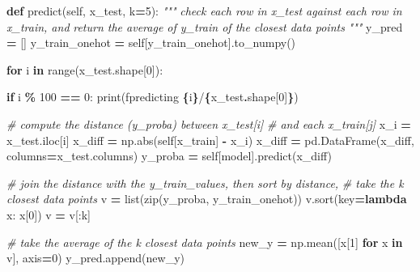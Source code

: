 \documentclass[
]{article}
\newenvironment{Shaded}{\begin{snugshade}}{\end{snugshade}}
\newcommand{\BuiltInTok}[1]{#1}
\newcommand{\CommentTok}[1]{\textcolor[rgb]{0.56,0.35,0.01}{\textit{#1}}}
\newcommand{\ControlFlowTok}[1]{\textcolor[rgb]{0.13,0.29,0.53}{\textbf{#1}}}
\newcommand{\DecValTok}[1]{\textcolor[rgb]{0.00,0.00,0.81}{#1}}
\newcommand{\KeywordTok}[1]{\textcolor[rgb]{0.13,0.29,0.53}{\textbf{#1}}}
\newcommand{\NormalTok}[1]{#1}
\newcommand{\OperatorTok}[1]{\textcolor[rgb]{0.81,0.36,0.00}{\textbf{#1}}}
\newcommand{\SpecialCharTok}[1]{\textcolor[rgb]{0.81,0.36,0.00}{\textbf{#1}}}
\newcommand{\SpecialStringTok}[1]{\textcolor[rgb]{0.31,0.60,0.02}{#1}}
\newcommand{\StringTok}[1]{\textcolor[rgb]{0.31,0.60,0.02}{#1}}
\newcommand{\VariableTok}[1]{\textcolor[rgb]{0.00,0.00,0.00}{#1}}
\begin{document}
\begin{Shaded}
\begin{Highlighting}[]
    \KeywordTok{def}\NormalTok{ predict(}\VariableTok{self}\NormalTok{, x\_test, k}\OperatorTok{=}\DecValTok{5}\NormalTok{):}
        \CommentTok{"""}
\CommentTok{        check each row in x\_test against each row in x\_train, and}
\CommentTok{        return the average of y\_train of the closest data points}
\CommentTok{        """}
\NormalTok{        y\_pred }\OperatorTok{=}\NormalTok{ []}
\NormalTok{        y\_train\_onehot }\OperatorTok{=} \VariableTok{self}\NormalTok{[}\StringTok{\textquotesingle{}y\_train\_onehot\textquotesingle{}}\NormalTok{].to\_numpy()}

        \ControlFlowTok{for}\NormalTok{ i }\KeywordTok{in} \BuiltInTok{range}\NormalTok{(x\_test.shape[}\DecValTok{0}\NormalTok{]):}

            \ControlFlowTok{if}\NormalTok{ i }\OperatorTok{\%} \DecValTok{100} \OperatorTok{==} \DecValTok{0}\NormalTok{:}
                \BuiltInTok{print}\NormalTok{(}\SpecialStringTok{f\textquotesingle{}predicting }\SpecialCharTok{\{}\NormalTok{i}\SpecialCharTok{\}}\SpecialStringTok{/}\SpecialCharTok{\{}\NormalTok{x\_test}\SpecialCharTok{.}\NormalTok{shape[}\DecValTok{0}\NormalTok{]}\SpecialCharTok{\}}\SpecialStringTok{\textquotesingle{}}\NormalTok{)}

            \CommentTok{\# compute the distance (y\_proba) between x\_test[i] }
            \CommentTok{\# and each x\_train[j]}
\NormalTok{            x\_i }\OperatorTok{=}\NormalTok{ x\_test.iloc[i]}
\NormalTok{            x\_diff }\OperatorTok{=}\NormalTok{ np.}\BuiltInTok{abs}\NormalTok{(}\VariableTok{self}\NormalTok{[}\StringTok{\textquotesingle{}x\_train\textquotesingle{}}\NormalTok{] }\OperatorTok{{-}}\NormalTok{ x\_i)}
\NormalTok{            x\_diff }\OperatorTok{=}\NormalTok{ pd.DataFrame(x\_diff, columns}\OperatorTok{=}\NormalTok{x\_test.columns)}
\NormalTok{            y\_proba }\OperatorTok{=} \VariableTok{self}\NormalTok{[}\StringTok{\textquotesingle{}model\textquotesingle{}}\NormalTok{].predict(x\_diff)}

            \CommentTok{\# join the distance with the y\_train\_values, then sort by distance, }
            \CommentTok{\# take the k closest data points}
\NormalTok{            v }\OperatorTok{=} \BuiltInTok{list}\NormalTok{(}\BuiltInTok{zip}\NormalTok{(y\_proba, y\_train\_onehot))}
\NormalTok{            v.sort(key}\OperatorTok{=}\KeywordTok{lambda}\NormalTok{ x: x[}\DecValTok{0}\NormalTok{])}
\NormalTok{            v }\OperatorTok{=}\NormalTok{ v[:k]}

            \CommentTok{\# take the average of the k closest data points}
\NormalTok{            new\_y }\OperatorTok{=}\NormalTok{ np.mean([x[}\DecValTok{1}\NormalTok{] }\ControlFlowTok{for}\NormalTok{ x }\KeywordTok{in}\NormalTok{ v], axis}\OperatorTok{=}\DecValTok{0}\NormalTok{)}
\NormalTok{            y\_pred.append(new\_y)}


\end{Highlighting}
\end{Shaded}
\end{document}
